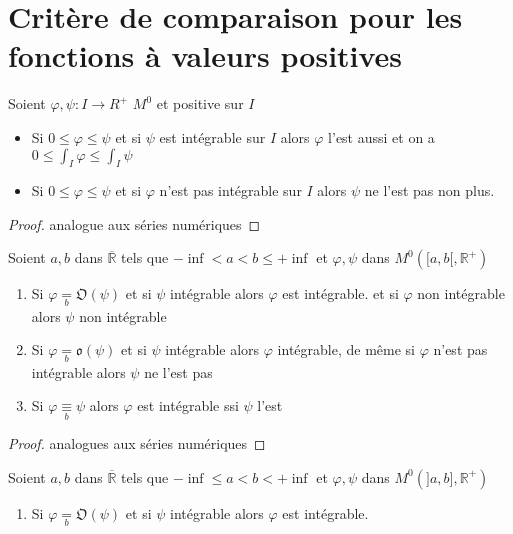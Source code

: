 \documentclass[11pt,hidelinks]{book}
\theoremstyle{mytheoremstyle}
\theoremstyle{mytheoremstyle}
\theoremstyle{mytheoremstyle}
\theoremstyle{mytheoremstyle}
\theoremstyle{mytheoremstyle}
\theoremstyle{mytheoremstyle}
\theoremstyle{mytheoremstyle}
\theoremstyle{mytheoremstyle}
\theoremstyle{myproblemstyle}
\def\mbb#1{\mathbb{#1}}
\def\mfk#1{\mathfrak{#1}}
\def\bR{\mbb{R}}
\newcommand{\func}[3]{#1\colon#2\to#3}
\begin{document}
\section{Critère de comparaison pour les fonctions à valeurs positives}
\begin{adjustwidth}{-2em}{-1em}
    \begin{theorem}
        Soient $\func{\varphi, \psi}{I}{R^+}$ $M^0$ et positive sur $I$
        \begin{itemize}[label=$\circ$]
            \item Si $0 \leq \varphi \leq \psi$ et si $\psi$ est intégrable sur $I$ alors $\varphi$ l'est aussi 
            et on a $0 \leq \int_I \varphi \leq \int_I \psi$
            \item Si $0 \leq \varphi \leq \psi$ et si $\varphi$ n'est pas intégrable sur $I$ alors $\psi$ ne l'est pas 
            non plus.
        \end{itemize}
        \begin{proof}
            analogue aux séries numériques
        \end{proof}
    \end{theorem}
    \begin{prop}
        Soient $a,b$ dans $\overline{\bR}$ tels que $-\inf < a < b \leq +\inf$ et $\varphi, \psi$ dans $M^0([a,b[,\bR^+)$
        \begin{enumerate}
            \item Si $\varphi \underset{b}{=} \mfk{O}(\psi)$ et si $\psi$ intégrable alors $\varphi$ est intégrable.
            et si $\varphi$ non intégrable alors $\psi$ non intégrable
            \item Si $\varphi \underset{b}{=} \mfk{o}(\psi)$ et si $\psi$ intégrable alors $\varphi$ intégrable, 
            de même si $\varphi$ n'est pas intégrable alors $\psi$ ne l'est pas 
            \item Si $\varphi \underset{b}{\equiv} \psi$ alors $\varphi$ est intégrable ssi $\psi$ l'est
          \end{enumerate}
          \begin{proof}
              analogues aux séries numériques
          \end{proof}
    \end{prop}
    \begin{prop}
        Soient $a,b$ dans $\overline{\bR}$ tels que $-\inf \leq a < b < +\inf$ et $\varphi, \psi$ dans $M^0(]a,b],\bR^+)$
        \begin{enumerate}
            \item Si $\varphi \underset{b}{=} \mfk{O}(\psi)$ et si $\psi$ intégrable alors $\varphi$ est intégrable.

\end{enumerate}
\end{prop}
\end{adjustwidth}
\end{document}

